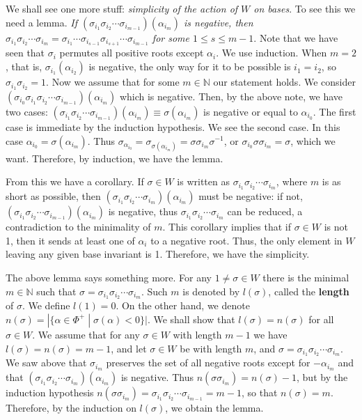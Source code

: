 \documentclass{article}
\newcommand{\NaN}{\mathbb{N}}
\newcommand{\SBar}{\;|\;}
\begin{document}
We shall see one more stuff: \textit{simplicity of the action of $W$ on bases}.
To see this we need a lemma.
\textit{If $(\sigma_{i_1} \sigma_{i_2} \cdots \sigma_{i_{m - 1}})(\alpha_{i_m})$ is negative, then $\sigma_{i_1} \sigma_{i_2} \cdots \sigma_{i_m} = \sigma_{i_1} \cdots\sigma_{i_{s - 1}} \sigma_{i_{s + 1}} \cdots \sigma_{i_{m - 1}}$ for some $1 \le s \le m - 1$}.
Note that we have seen that $\sigma_i$ permutes all positive roots except $\alpha_i$.
We use induction.
When $m = 2$, that is, $\sigma_{i_1}(\alpha_{i_2})$ is negative, the only way for it to be possible is $i_1 = i_2$, so $ \sigma_{i_1} \sigma_{i_2} = 1$.
Now we assume that for some $m \in \NaN$ our statement holds.
We consider $(\sigma_{i_0} \sigma_{i_1} \sigma_{i_2} \cdots \sigma_{i_{m - 1}})(\alpha_{i_m})$ which is negative.
Then, by the above note, we have two cases: $(\sigma_{i_1} \sigma_{i_2} \cdots \sigma_{i_{m - 1}})(\alpha_{i_m}) \equiv \sigma(\alpha_{i_m})$ is negative or equal to $\alpha_{i_0}$.
The first case is immediate by the induction hypothesis.
We see the second case.
In this case $\alpha_{i_0} = \sigma(\alpha_{i_m})$.
Thus $\sigma_{\alpha_{i_0}} = \sigma_{\sigma(\alpha_{i_m})} = \sigma \sigma_{i_m} \sigma^{-1}$, or $\sigma_{i_0} \sigma \sigma_{i_m} = \sigma$, which we want.
Therefore, by induction, we have the lemma.

From this we have a corollary.
If $\sigma \in W$ is written as $\sigma_{i_1} \sigma_{i_2} \cdots \sigma_{i_m}$, where $m$ is as short as possible, then $(\sigma_{i_1} \sigma_{i_2} \cdots \sigma_{i_m})(\alpha_{i_m})$ must be negative: if not, $(\sigma_{i_1} \sigma_{i_2} \cdots \sigma_{i_{m - 1}})(\alpha_{i_m})$ is negative, thus $\sigma_{i_1} \sigma_{i_2} \cdots \sigma_{i_m}$ can be reduced, a contradiction to the minimality of $m$.
This corollary implies that if $\sigma \in W$ is not 1, then it sends at least one of $\alpha_i$ to a negative root.
Thus, the only element in $W$ leaving any given base invariant is 1.
Therefore, we have the simplicity.

The above lemma says something more.
For any $1 \ne \sigma \in W$ there is the minimal $m \in \NaN$ such that $\sigma = \sigma_{i_1} \sigma_{i_2} \cdots \sigma_{i_m}$.
Such $m$ is denoted by $l(\sigma)$, called the \textbf{length} of $\sigma$.
We define $l(1) = 0$.
On the other hand, we denote $n(\sigma) = |\{\alpha \in \Phi^+ \SBar \sigma(\alpha) < 0\}|$.
We shall show that $l(\sigma) = n(\sigma)$ for all $\sigma \in W$.
We assume that for any $\sigma \in W$ with length $m - 1$ we have $l(\sigma) = n(\sigma) = m - 1$, and let $\sigma \in W$ be with length $m$, and $\sigma = \sigma_{i_1} \sigma_{i_2} \cdots \sigma_{i_m}$.
We saw above that $\sigma_{i_m}$ preserves the set of all negative roots except for $-\alpha_{i_m}$ and that $(\sigma_{i_1} \sigma_{i_2} \cdots \sigma_{i_m})(\alpha_{i_m})$ is negative.
Thus $n(\sigma \sigma_{i_m}) = n(\sigma) - 1$, but by the induction hypothesis $n(\sigma \sigma_{i_m}) = \sigma_{i_1} \sigma_{i_2} \cdots \sigma_{i_{m - 1}} = m - 1$, so that $n(\sigma) = m$.
Therefore, by the induction on $l(\sigma)$, we obtain the lemma.
\end{document}
